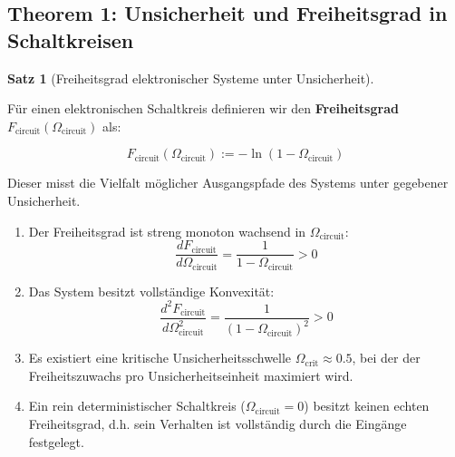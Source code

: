 \documentclass[a4paper,12pt,twoside]{report}
\theoremstyle{definition}
\newtheorem{satz}{Satz}
\begin{document}
\subsection*{Theorem 1: Unsicherheit und Freiheitsgrad in Schaltkreisen}

\begin{satz}[Freiheitsgrad elektronischer Systeme unter Unsicherheit]
\label{satz:freiheit_circuit}

Für einen elektronischen Schaltkreis definieren wir den \textbf{Freiheitsgrad} $F_{\text{circuit}}(\Omega_{\text{circuit}})$ als:

\begin{equation}
F_{\text{circuit}}(\Omega_{\text{circuit}}) := -\ln(1 - \Omega_{\text{circuit}})
\end{equation}

Dieser misst die Vielfalt möglicher Ausgangspfade des Systems unter gegebener Unsicherheit.

\begin{enumerate}
    \item Der Freiheitsgrad ist streng monoton wachsend in $\Omega_{\text{circuit}}$:
    \begin{equation}
    \frac{dF_{\text{circuit}}}{d\Omega_{\text{circuit}}} = \frac{1}{1 - \Omega_{\text{circuit}}} > 0
    \end{equation}
    
    \item Das System besitzt vollständige Konvexität:
    \begin{equation}
    \frac{d^2F_{\text{circuit}}}{d\Omega_{\text{circuit}}^2} = \frac{1}{(1 - \Omega_{\text{circuit}})^2} > 0
    \end{equation}
    
    \item Es existiert eine kritische Unsicherheitsschwelle $\Omega_{\text{crit}} \approx 0.5$, bei der der Freiheitszuwachs pro Unsicherheitseinheit maximiert wird.
    
    \item Ein rein deterministischer Schaltkreis ($\Omega_{\text{circuit}} = 0$) besitzt keinen echten Freiheitsgrad, d.h. sein Verhalten ist vollständig durch die Eingänge festgelegt.
\end{enumerate}

\end{satz}
\end{document}
